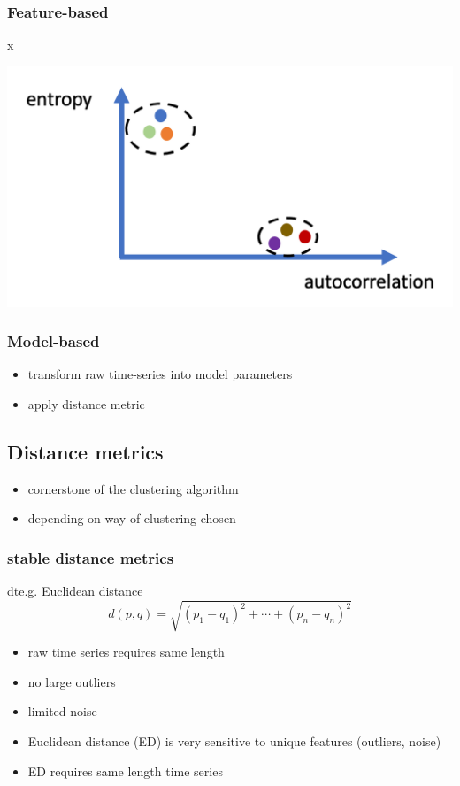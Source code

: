 \documentclass[11pt]{article}
\begin{document}
\subsubsection*{Feature-based}
\label{sec:orgd85dcf4}
x
\begin{center}
\includegraphics[width=.9\linewidth]{./img/feature_based_clustering.png}
\end{center}
\subsubsection*{Model-based}
\label{sec:orgcb8b761}
\begin{itemize}
\item transform raw time-series into model parameters
\item apply distance metric
\end{itemize}

\subsection*{Distance metrics}
\label{sec:orgf1b4e63}
\begin{itemize}
\item cornerstone of the clustering algorithm
\item depending on way of clustering chosen
\end{itemize}
\subsubsection*{stable distance metrics}
\label{sec:org7d06956}
dte.g. Euclidean distance
  $$ d(p,q) = \sqrt{(p_1 - q_1)^2 + \cdots + (p_n - q_n)^2} $$
\begin{itemize}
\item raw time series requires same length
\item no large outliers
\item limited noise
\end{itemize}
\begin{NOTES}
\begin{itemize}
\item Euclidean distance (ED) is very sensitive to unique features (outliers, noise)
\item ED requires same length time series
\end{itemize}
\end{NOTES}
\end{document}
